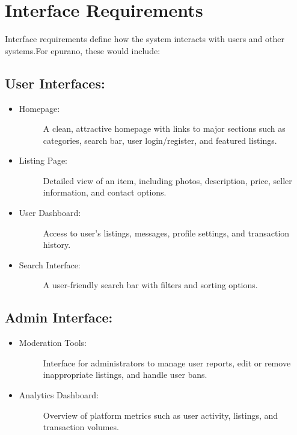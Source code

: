 \section{Interface Requirements}
Interface requirements define how the system interacts with users and other systems.For epurano, these would include:

\subsection{User Interfaces:}
\begin{itemize}
    \item \begin{description}
        \item[Homepage:] A clean, attractive homepage with links to major sections such as categories, search bar, user login/register, and featured listings.
    \end{description}
    \item \begin{description}
        \item[Listing Page:] Detailed view of an item, including photos, description, price, seller information, and contact options.
    \end{description}
    \item \begin{description}
        \item[User Dashboard:] Access to user’s listings, messages, profile settings, and transaction history.
    \end{description}
    \item \begin{description}
        \item[Search Interface:] A user-friendly search bar with filters and sorting options.
    \end{description}
\end{itemize} 

\subsection{Admin Interface:}
\begin{itemize}
    \item \begin{description}
        \item[Moderation Tools:] Interface for administrators to manage user reports, edit or remove inappropriate listings, and handle user bans.
    \end{description}
    \item \begin{description}
        \item[Analytics Dashboard:] Overview of platform metrics such as user activity, listings, and transaction volumes.
    \end{description}
\end{itemize} 

